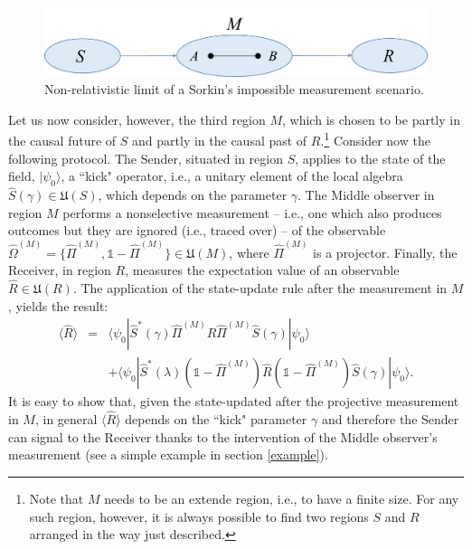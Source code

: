 \documentclass[12pt]{article}
\newcommand{\ket}[1]{| {#1} \rangle} %
\newcommand{\bra}[1]{\langle {#1} |} %
\begin{document}
 \begin{figure}[ht]
    \centering
    \includegraphics[width=.48\textwidth]{nonrela.png}
    \caption{Non-relativistic limit of a Sorkin's impossible measurement scenario.}
    \label{fig2}
\end{figure}

Let us now consider, however, the third  region $M$, which is chosen to be partly in the causal future of $S$ and partly in the causal past of $R$.\footnote{Note that $M$ needs to be an extende region, i.e., to have a finite size. For any such region, however, it is always possible to find two regions $S$ and $R$ arranged in the way just described.} 
Consider now the following protocol. The Sender, situated in region $S$, applies to the state of the field, $\ket{\psi_0}$, a ``kick" operator, i.e., a unitary element of the local algebra $\hat S(\gamma) \in \mathfrak{U}(S)$, which depends on the parameter $\gamma$. 
The Middle observer in region $M$ performs a nonselective measurement -- i.e., one which also produces outcomes but they are ignored (i.e., traced over) -- of the observable $\hat \Omega^{(M)}=\{\hat \Pi^{(M)}, \mathds{1} - \hat \Pi^{(M)}\}  \in \mathfrak{U}(M)$, where $\hat \Pi^{(M)}$ is a projector.
Finally, the Receiver, in region $R$, measures the expectation value of an observable $\hat R \in \mathfrak{U}(R)$. The application of the state-update rule after the measurement in $M$, yields the result:
\begin{eqnarray}
       \langle \hat R \rangle &=& \bra{\psi_0} \hat S^*(\gamma) \hat \Pi^{(M)} \hat R \hat \Pi^{(M)} \hat S(\gamma) \ket{\psi_0} \\
       &&+  \bra{\psi_0} \hat S^*(\lambda) (\mathds{1} - \hat \Pi^{(M)}) \hat R (\mathds{1} - \hat \Pi^{(M)}) \hat S(\gamma) \ket{\psi_0}. \nonumber
\end{eqnarray}
  It is easy to show that, given the state-updated after the projective measurement in $M$, in general $\langle \hat R \rangle$ depends on the ``kick" parameter $\gamma$ and therefore the Sender can signal to the Receiver thanks to the  intervention of the Middle observer's measurement (see a simple example in section \ref{example}).
\end{document}

